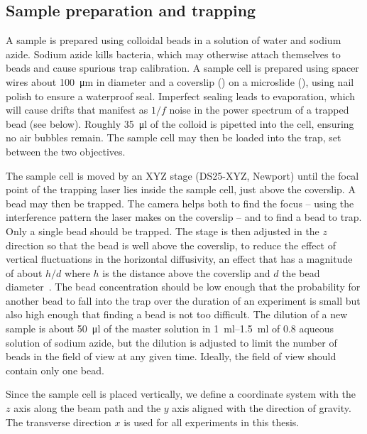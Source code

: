 \documentclass[hyperref={colorlinks=true, urlcolor=blue, citecolor=blue, final, bound}]{sfuthesis}
\begin{document}
\subsection{Sample preparation and trapping}
A sample is prepared using colloidal beads in a solution of water and sodium azide. Sodium azide kills bacteria, which may otherwise attach themselves to beads and cause spurious trap calibration. A sample cell is prepared using spacer wires about \qty{100}{\micro\metre} in diameter and a coverslip () on a microslide (), using nail polish to ensure a waterproof seal. Imperfect sealing leads to evaporation, which will cause drifts that manifest as $1/f$ noise in the power spectrum of a trapped bead (see below). Roughly \qty{35}{\micro\litre} of the colloid is pipetted into the cell, ensuring no air bubbles remain. The sample cell may then be loaded into the trap, set between the two objectives. 

The sample cell is moved by an XYZ stage (DS25-XYZ, Newport) until the focal point of the trapping laser lies inside the sample cell, just above the coverslip. A bead may then be trapped. The camera helps both to find the focus -- using the interference pattern the laser makes on the coverslip -- and to find a bead to trap. Only a single bead should be trapped. The stage is then adjusted in the $z$ direction so that the bead is well above the coverslip, to reduce the effect of vertical fluctuations in the horizontal diffusivity, an effect that has a magnitude of about $h/d$ where $h$ is the distance above the coverslip and $d$ the bead diameter~\cite{Sharma2010}. The bead concentration should be low enough that the probability for another bead to fall into the trap over the duration of an experiment is small but also high enough that finding a bead is not too difficult. The dilution of a new sample is about \qty{50}{\micro\litre} of the master solution in \qtyrange{1}{1.5}{\milli\litre} of \qty{0.8}{\molar} aqueous solution of sodium azide, but the dilution is adjusted to limit the number of beads in the field of view at any given time. Ideally, the field of view should contain only one bead. 

Since the sample cell is placed vertically, we define a coordinate system with the $z$ axis along the beam path and the $y$ axis aligned with the direction of gravity. The transverse direction $x$ is used for all experiments in this thesis.
\end{document}
